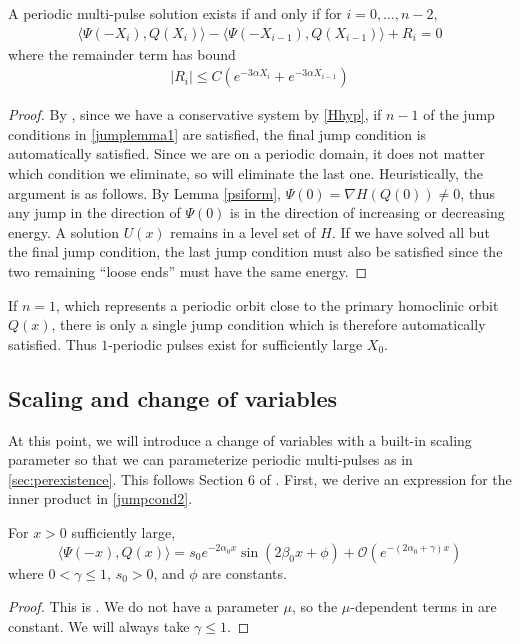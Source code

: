 \documentclass[thesis.tex]{subfiles}
\begin{document}
\begin{lemma}\label{jumplemma2}
A periodic multi-pulse solution exists if and only if for $i = 0, \dots, n-2$,
\begin{align}\label{jumpcond2}
\langle \Psi(-X_i), Q(X_i) \rangle - \langle \Psi(-X_{i-1}), Q(X_{i-1}) \rangle + R_i = 0
\end{align}
where the remainder term has bound
\begin{align*}
|R_i| \leq C ( e^{-3 \alpha X_i} +  e^{-3 \alpha X_{i-1}})
\end{align*}
\begin{proof}
By \cite[p. 2093]{SandstedeStrut}, since we have a conservative system by \cref{Hhyp}, if $n-1$ of the jump conditions in \cref{jumplemma1} are satisfied, the final jump condition is automatically satisfied. Since we are on a periodic domain, it does not matter which condition we eliminate, so will eliminate the last one. Heuristically, the argument is as follows. By Lemma \ref{psiform}, $\Psi(0) = \nabla H(Q(0)) \neq 0$, thus any jump in the direction of $\Psi(0)$ is in the direction of increasing or decreasing energy. A solution $U(x)$ remains in a level set of $H$. If we have solved all but the final jump condition, the last jump condition must also be satisfied since the two remaining ``loose ends'' must have the same energy.
\end{proof}
\end{lemma}

\begin{remark}
If $n = 1$, which represents a periodic orbit close to the primary homoclinic orbit $Q(x)$, there is only a single jump condition which is therefore automatically satisfied. Thus $1$-periodic pulses exist for sufficiently large $X_0$.
\end{remark}

\subsection{Scaling and change of variables}\label{sec:rescale}

At this point, we will introduce a change of variables with a built-in scaling parameter so that we can parameterize periodic multi-pulses as in \cref{sec:perexistence}. This follows Section 6 of \cite{Sandstede1998}. First, we derive an expression for the inner product in \ref{jumpcond2}.


\begin{lemma}\label{IPform}
For $x > 0$ sufficiently large,
\begin{equation}\label{IPalphabeta}
\langle \Psi(-x), Q(x) \rangle
= s_0 e^{-2 \alpha_0 x} \sin(2 \beta_0 x + \phi) + \mathcal{O}(e^{-(2 \alpha_0 + \gamma) x})
\end{equation}
where $0 < \gamma \leq 1$, $s_0 > 0$, and $\phi$ are constants.
\begin{proof}
This is \cite[Lemma 6.1(i)]{Sandstede1998}. We do not have a parameter $\mu$, so the $\mu$-dependent terms in \cite[Lemma 6.1(i)]{Sandstede1998} are constant. We will always take $\gamma \leq 1$.
\end{proof}
\end{lemma}
\end{document}
